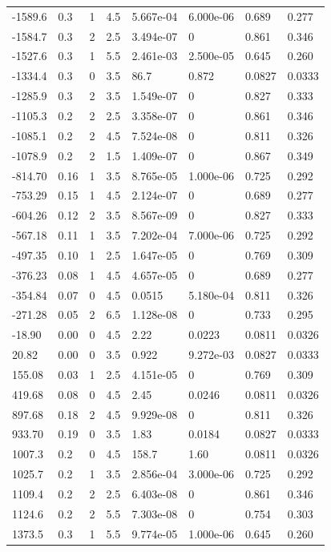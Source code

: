 \documentclass[preview]{standalone}
\begin{document}
{{\begin{tabular}{L{1.2cm}C{1.2cm} C{0.3cm}C{0.5cm} C{1.4cm}C{1.4cm} C{1.4cm}C{1.4cm}}
  -1589.6  &   0.3  & 1     & 4.5 &  5.667e-04  & 6.000e-06  & 0.689 &  0.277   \\ 
  -1584.7  &   0.3  & 2     & 2.5 &  3.494e-07  & 0  & 0.861 &  0.346   \\ 
  -1527.6  &   0.3  & 1     & 5.5 &  2.461e-03  & 2.500e-05  & 0.645 &  0.260   \\ 
  -1334.4  &   0.3  & 0     & 3.5 &  86.7  & 0.872  & 0.0827 &  0.0333   \\ 
  -1285.9  &   0.3  & 2     & 3.5 &  1.549e-07  & 0  & 0.827 &  0.333   \\ 
  -1105.3  &   0.2  & 2     & 2.5 &  3.358e-07  & 0  & 0.861 &  0.346   \\ 
  -1085.1  &   0.2  & 2     & 4.5 &  7.524e-08  & 0  & 0.811 &  0.326   \\ 
  -1078.9  &   0.2  & 2     & 1.5 &  1.409e-07  & 0  & 0.867 &  0.349   \\ 
  -814.70  &  0.16  & 1     & 3.5 &  8.765e-05  & 1.000e-06  & 0.725 &  0.292   \\ 
  -753.29  &  0.15  & 1     & 4.5 &  2.124e-07  & 0  & 0.689 &  0.277   \\ 
  -604.26  &  0.12  & 2     & 3.5 &  8.567e-09  & 0  & 0.827 &  0.333   \\ 
  -567.18  &  0.11  & 1     & 3.5 &  7.202e-04  & 7.000e-06  & 0.725 &  0.292   \\ 
  -497.35  &  0.10  & 1     & 2.5 &  1.647e-05  & 0  & 0.769 &  0.309   \\ 
  -376.23  &  0.08  & 1     & 4.5 &  4.657e-05  & 0  & 0.689 &  0.277   \\ 
  -354.84  &  0.07  & 0     & 4.5 &  0.0515  & 5.180e-04  & 0.811 &  0.326   \\ 
  -271.28  &  0.05  & 2     & 6.5 &  1.128e-08  & 0  & 0.733 &  0.295   \\ 
  -18.90  &  0.00  & 0     & 4.5 &  2.22  & 0.0223  & 0.0811 &  0.0326   \\ 
  20.82  &  0.00  & 0     & 3.5 &  0.922  & 9.272e-03  & 0.0827 &  0.0333   \\ 
  155.08  &  0.03  & 1     & 2.5 &  4.151e-05  & 0  & 0.769 &  0.309   \\ 
  419.68  &  0.08  & 0     & 4.5 &  2.45  & 0.0246  & 0.0811 &  0.0326   \\ 
  897.68  &  0.18  & 2     & 4.5 &  9.929e-08  & 0  & 0.811 &  0.326   \\ 
  933.70  &  0.19  & 0     & 3.5 &  1.83  & 0.0184  & 0.0827 &  0.0333   \\ 
  1007.3  &   0.2  & 0     & 4.5 &  158.7  & 1.60  & 0.0811 &  0.0326   \\ 
  1025.7  &   0.2  & 1     & 3.5 &  2.856e-04  & 3.000e-06  & 0.725 &  0.292   \\ 
  1109.4  &   0.2  & 2     & 2.5 &  6.403e-08  & 0  & 0.861 &  0.346   \\ 
  1124.6  &   0.2  & 2     & 5.5 &  7.303e-08  & 0  & 0.754 &  0.303   \\ 
  1373.5  &   0.3  & 1     & 5.5 &  9.774e-05  & 1.000e-06  & 0.645 &  0.260   \\ 
\hline 
\end{tabular} 

}}
\end{document}
